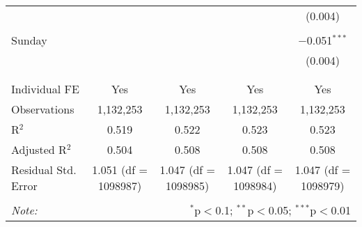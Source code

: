 \documentclass[
]{article}
\begin{document}
\begin{table}[!htbp]
{\begin{tabular}{@{\extracolsep{5pt}}lcccc}
  &  &  &  & (0.004) \\ 
  & & & & \\ 
 Sunday &  &  &  & $-$0.051$^{***}$ \\ 
  &  &  &  & (0.004) \\ 
  & & & & \\ 
\hline \\[-1.8ex] 
Individual FE & Yes & Yes & Yes & Yes \\ 
Observations & 1,132,253 & 1,132,253 & 1,132,253 & 1,132,253 \\ 
R$^{2}$ & 0.519 & 0.522 & 0.523 & 0.523 \\ 
Adjusted R$^{2}$ & 0.504 & 0.508 & 0.508 & 0.508 \\ 
Residual Std. Error & 1.051 (df = 1098987) & 1.047 (df = 1098985) & 1.047 (df = 1098984) & 1.047 (df = 1098979) \\ 
\hline 
\hline \\[-1.8ex] 
\textit{Note:}  & \multicolumn{4}{r}{$^{*}$p$<$0.1; $^{**}$p$<$0.05; $^{***}$p$<$0.01} \\ 
\end{tabular}
} 
\end{table} 
\newpage
\end{document}
